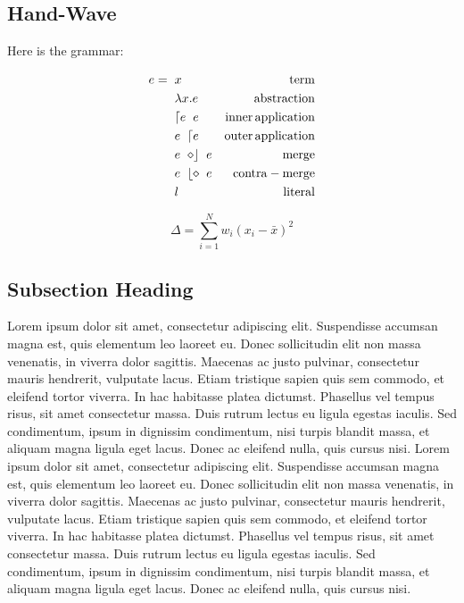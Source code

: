 \documentclass{article}
\begin{document}
\subsection{Hand-Wave}

Here is the grammar:

\begin{align}
e = \hspace{2mm} & x           & \mathrm{term}\\
                 & \lambda x.e & \mathrm{abstraction}\\
                 & \lceil e \hspace{2mm} e & \mathrm{inner \, application}\\
                 & e \hspace{2mm} \lceil e & \mathrm{outer \, application}\\
                 & e \hspace{2mm} \diamond \rfloor \hspace{2mm} e & \mathrm{merge}\\
                 & e \hspace{2mm} \lfloor \diamond \hspace{2mm} e & \mathrm{contra-merge}\\
                 & l & \mathrm{literal}
\end{align}

\begin{equation}
\Delta =\sum_{i=1}^N w_i (x_i - \bar{x})^2
\label{eqn:eq1}
\end{equation}

\subsection{Subsection Heading}

Lorem ipsum dolor sit amet, consectetur adipiscing elit. Suspendisse accumsan magna est, quis elementum leo laoreet eu. Donec sollicitudin elit non massa venenatis, in viverra dolor sagittis. Maecenas ac justo pulvinar, consectetur mauris hendrerit, vulputate lacus. Etiam tristique sapien quis sem commodo, et eleifend tortor viverra. In hac habitasse platea dictumst. Phasellus vel tempus risus, sit amet consectetur massa. Duis rutrum lectus eu ligula egestas iaculis. Sed condimentum, ipsum in dignissim condimentum, nisi turpis blandit massa, et aliquam magna ligula eget lacus. Donec ac eleifend nulla, quis cursus nisi. Lorem ipsum dolor sit amet, consectetur adipiscing elit. Suspendisse accumsan magna est, quis elementum leo laoreet eu. Donec sollicitudin elit non massa venenatis, in viverra dolor sagittis. Maecenas ac justo pulvinar, consectetur mauris hendrerit, vulputate lacus. Etiam tristique sapien quis sem commodo, et eleifend tortor viverra. In hac habitasse platea dictumst. Phasellus vel tempus risus, sit amet consectetur massa. Duis rutrum lectus eu ligula egestas iaculis. Sed condimentum, ipsum in dignissim condimentum, nisi turpis blandit massa, et aliquam magna ligula eget lacus. Donec ac eleifend nulla, quis cursus nisi.
\end{document}
